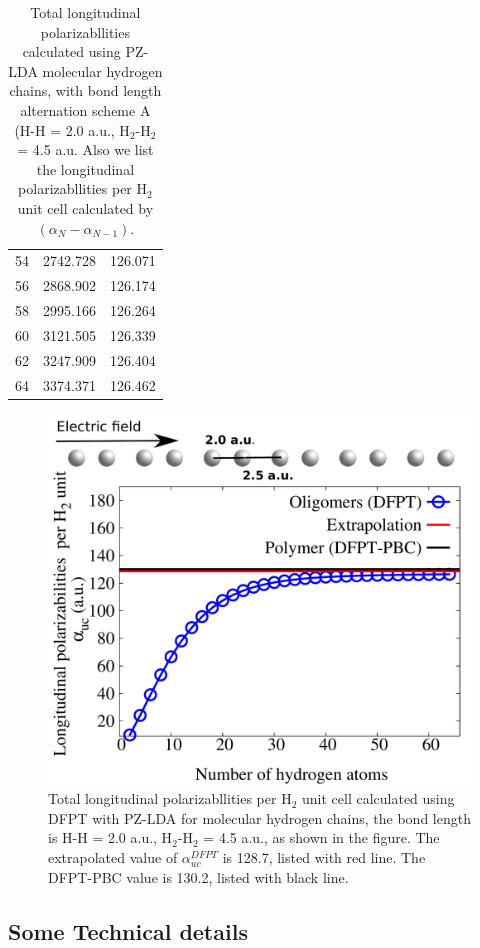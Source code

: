 {\begin{table}
\begin{tabular}{c|  c c}
54    &  2742.728  &  126.071 \\
56    &  2868.902  &  126.174 \\
58    &  2995.166  &  126.264 \\
60    &  3121.505  &  126.339 \\
62    &  3247.909  &  126.404 \\
64    &  3374.371  &  126.462 \\
\hline \hline
\end{tabular}
\caption{Total longitudinal polarizabllities calculated using PZ-LDA molecular hydrogen chains, with bond length alternation scheme A (H-H = 2.0 a.u., H$_2$-H$_2$ = 4.5 a.u. Also we list the longitudinal polarizabllities per H$_2$ unit cell calculated by $(\alpha_N-\alpha_{N-1})$. }
\end{table}



\begin{figure}
\includegraphics[width=0.9\columnwidth]{H2_chain_Extrapolation_PZ-LDA.pdf}
\caption{Total longitudinal polarizabllities per H$_2$ unit cell calculated using DFPT with PZ-LDA for molecular hydrogen chains, the bond length is H-H = 2.0 a.u., H$_2$-H$_2$ = 4.5 a.u., as shown in the figure. The extrapolated value of $\alpha^{DFPT}_{uc}$ is 128.7, listed with red line. The DFPT-PBC value is 130.2, listed with black line. }
\label{fig:H2_line}
\end{figure}



\subsection*{Some Technical details}
}
